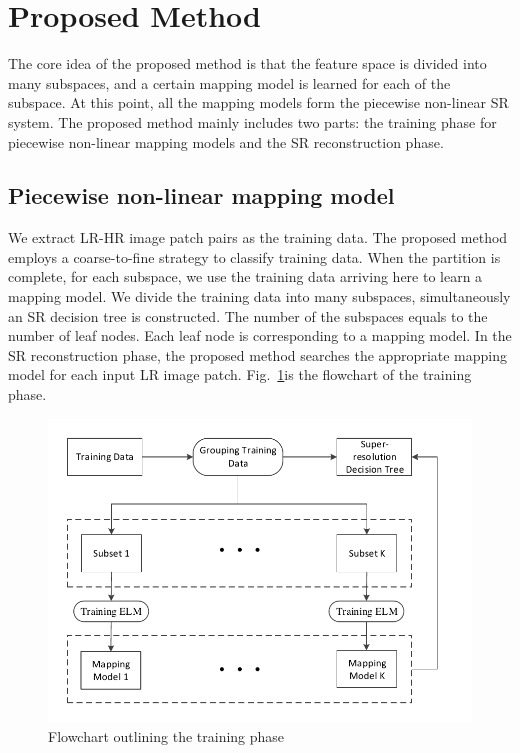 \documentclass[review,numbers,sort&compress]{elsarticle}  %
\begin{document}
\section{Proposed Method}
The core idea of the proposed method is that the feature space is divided into many subspaces, and a certain mapping model is learned for each of the subspace. At this point, all the mapping models form the piecewise non-linear SR system. The proposed method mainly includes two parts: the training phase for piecewise non-linear mapping models and the SR reconstruction phase.


\subsection{Piecewise non-linear mapping model}
We extract LR-HR image patch pairs as the training data. The proposed method employs a coarse-to-fine strategy to classify training data. When the partition is complete, for each subspace, we use the training data arriving here to learn a mapping model. We divide the training data into many subspaces, simultaneously an SR decision tree is constructed. The number of the subspaces equals to the number of leaf nodes. Each leaf node is corresponding to a mapping model. In the SR reconstruction phase, the proposed method searches the appropriate mapping model for each input LR image patch. Fig.~\ref{fig:FlowchartForTrain}is the flowchart of the training phase.

\begin{figure}[htbp]
  \centering
  \includegraphics[width=0.8\linewidth]{graphs/FlowForTraining_e.pdf}
  \caption{Flowchart outlining the training phase}\label{fig:FlowchartForTrain}
\end{figure}
\end{document}
